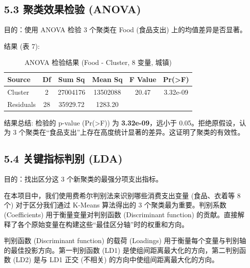 \documentclass[12pt, a4paper]{article}
\begin{document}
\subsection*{5.3 聚类效果检验 (ANOVA)}
\noindent 目的：使用 ANOVA 检验 3 个聚类在 Food (食品支出) 上的均值差异是否显著。

\noindent 结果 (表 7):
\begin{table}[H]
    \centering
    \caption{ANOVA 检验结果 (Food - Cluster, 8 变量, 城镇)}
    \label{tab:anova_food_cluster}
    \begin{tabularx}{\textwidth}{X|c|c|c|c|c}
        \toprule
        \textbf{Source} & \textbf{Df} & \textbf{Sum Sq} & \textbf{Mean Sq} & \textbf{F Value} & \textbf{Pr(>F)} \\
        \midrule
        Cluster & 2 & 27004176 & 13502088 & 20.47 & 3.32e-09 \\
        Residuals & 28 & 35929.72 & 1283.20 & & \\ %
        \bottomrule
    \end{tabularx}
\end{table}

\noindent 结果总结: 检验的 p-value (Pr(>F)) 为 \textbf{3.32e-09}，远小于 0.05。拒绝原假设，认为 3 个聚类在“食品支出”上存在高度统计显著的差异。这证明了聚类的有效性。

\subsection*{5.4 关键指标判别 (LDA)}
\noindent 目的：找出区分这 3 个新聚类的最强分项支出指标。

\noindent 在本项目中，我们使用费希尔判别法来识别哪些消费支出变量 (食品、衣着等 8 个) 对于区分我们通过 K-Means 算法得出的 3 个聚类最为重要。判别系数 (Coefficients) 用于衡量变量对判别函数 (Discriminant function) 的贡献。直接解释了各个原始变量在构建这些“最佳区分轴”时的权重和方向。

\noindent 判别函数 (Discriminant function) 的载荷 (Loadings) 用于衡量每个变量与判别轴的最佳投影方向。第一判别函数 (LD1) 是使组间距离最大化的方向，第二判别函数 (LD2) 是与 LD1 正交 (不相关) 的方向中使组间距离最大化的方向。
\end{document}
